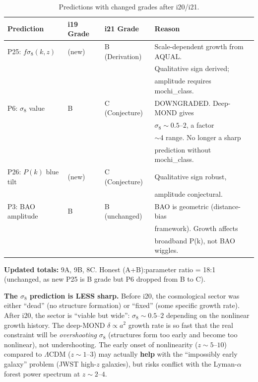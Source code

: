 \documentclass[11pt]{article}
\newcommand{\LCDM}{$\Lambda$CDM}
\begin{document}
\begin{tcolorbox}[colback=blue!5!white, colframe=blue!70!black,
  title=\textbf{TOP 5 FINDINGS (Ranked by Impact on DFD Programme)}]
\begin{enumerate}
  \begin{table}[h]
  \centering
  \caption{Predictions with changed grades after i20/i21.}
  \begin{tabular}{llll}
  \toprule
  \textbf{Prediction} & \textbf{i19 Grade} & \textbf{i21 Grade}
    & \textbf{Reason} \\
  \midrule
  P25: $f\sigma_8(k,z)$ & (new) & B (Derivation)
    & Scale-dependent growth from AQUAL. \\
  & & & Qualitative sign derived; \\
  & & & amplitude requires mochi\_class. \\[3pt]
  P6: $\sigma_8$ value & B & C (Conjecture)
    & DOWNGRADED. Deep-MOND gives \\
  & & & $\sigma_8 \sim 0.5$--$2$, a factor \\
  & & & $\sim$4 range. No longer a sharp \\
  & & & prediction without mochi\_class. \\[3pt]
  P26: $P(k)$ blue tilt & (new) & C (Conjecture)
    & Qualitative sign robust, \\
  & & & amplitude conjectural. \\[3pt]
  P3: BAO amplitude & B & B (unchanged)
    & BAO is geometric (distance-bias \\
  & & & framework). Growth affects \\
  & & & broadband P(k), not BAO wiggles. \\
  \bottomrule
  \end{tabular}
  \end{table}

  \textbf{Updated totals:} 9A, 9B, 8C. Honest (A+B):parameter
  ratio = 18:1 (unchanged, as new P25 is B grade but P6 dropped
  from B to C).

  \textbf{The $\sigma_8$ prediction is LESS sharp.}  Before i20,
  the cosmological sector was either ``dead'' (no structure formation)
  or ``fixed'' (some specific growth rate).  After i20, the sector is
  ``viable but wide'': $\sigma_8 \sim 0.5$--$2$ depending on the
  nonlinear growth history.  The deep-MOND $\delta \propto a^2$
  growth rate is so fast that the real constraint will be
  \emph{overshooting} $\sigma_8$ (structures form too early and become
  too nonlinear), not undershooting.  The early onset of nonlinearity
  ($z \sim 5$--$10$) compared to \LCDM{} ($z \sim 1$--$3$) may actually
  \textbf{help} with the ``impossibly early galaxy'' problem
  (JWST high-$z$ galaxies), but risks conflict with the Lyman-$\alpha$
  forest power spectrum at $z \sim 2$--$4$.


\end{enumerate}
\end{tcolorbox}
\end{document}
